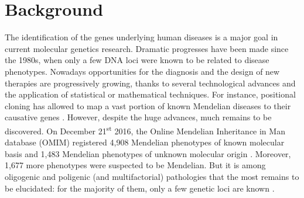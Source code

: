 \documentclass[twocolumn]{bmcart}%
\begin{document}


\section*{Background}
The identification of the genes underlying human diseases is a major goal in current molecular genetics research. Dramatic progresses have been made since the 1980s, when only a few DNA loci were known to be related to disease phenotypes. Nowadays opportunities for the diagnosis and the design of new therapies are progressively growing, thanks to several technological advances and the application of statistical or mathematical techniques. For instance, positional cloning has allowed to map a vast portion of known Mendelian diseases to their causative genes \cite{strachan,botstein}. However, despite the huge advances, much remains to be discovered. On December 21\textsuperscript{st} 2016, the Online Mendelian Inheritance in Man database (OMIM) registered 4,908 Mendelian phenotypes of known molecular basis and 1,483 Mendelian phenotypes of unknown molecular origin \cite{omim}. Moreover, 1,677 more phenotypes were suspected to be Mendelian. But it is among oligogenic and poligenic (and multifactorial) pathologies that the most remains to be elucidated: for the majority of them, only a few genetic loci are known \cite{strachan,botstein}.
\end{document}
